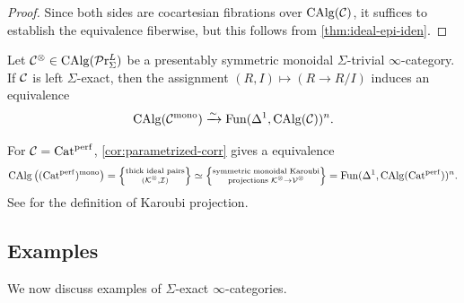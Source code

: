 \documentclass[10pt,a4paper,oneside]{article}
\begin{document}
\begin{proof}
Since both sides are cocartesian fibrations over $\operatorname{CAlg}(\mathcal{C})$, it suffices to establish the equivalence fiberwise, but this follows from \cref{thm:ideal-epi-iden}.
\end{proof}

\begin{cor}\label{cor:parametrized-corr}
Let $\mathcal{C}^\otimes\in\operatorname{CAlg}(\mathcal{P}\mathrm{r}^L_{\Sigma})$ be a presentably symmetric monoidal $\Sigma$-trivial $\infty$-category. If $\mathcal{C}$ is left $\Sigma$-exact, then the assignment $(R,I)\mapsto (R\to R/I)$ induces an equivalence $$\operatorname{CAlg}(\mathcal{C}^{\operatorname{mono}})\xrightarrow{\sim}\operatorname{Fun}(\Delta^1,\operatorname{CAlg}(\mathcal{C}))^n.$$
\end{cor}

\begin{ex}
For $\mathcal{C}=\operatorname{Cat}^{\operatorname{perf}}$, \cref{cor:parametrized-corr} gives a equivalence  \[
\operatorname{CAlg}\big((\operatorname{Cat}^{\operatorname{perf}})^{\operatorname{mono}}\big)=\left\{
\substack{
\text{thick ideal pairs} \\
(\mathcal{K}^\otimes,\mathcal{I})
}
\right\}
\simeq 
\left\{
\substack{
\text{symmetric monoidal Karoubi} \\
\text{projections }\mathcal{K}^\otimes\to \mathcal{V}^\otimes
}
\right\}=\operatorname{Fun}(\Delta^1,\operatorname{CAlg}(\operatorname{Cat}^{\operatorname{perf}}))^n.
\]
See \cite[Definition~A.3.6]{hermitionkii} for the definition of Karoubi projection.
\end{ex}

\subsection{Examples}
We now discuss examples of $\Sigma$-exact $\infty$-categories.
\end{document}
